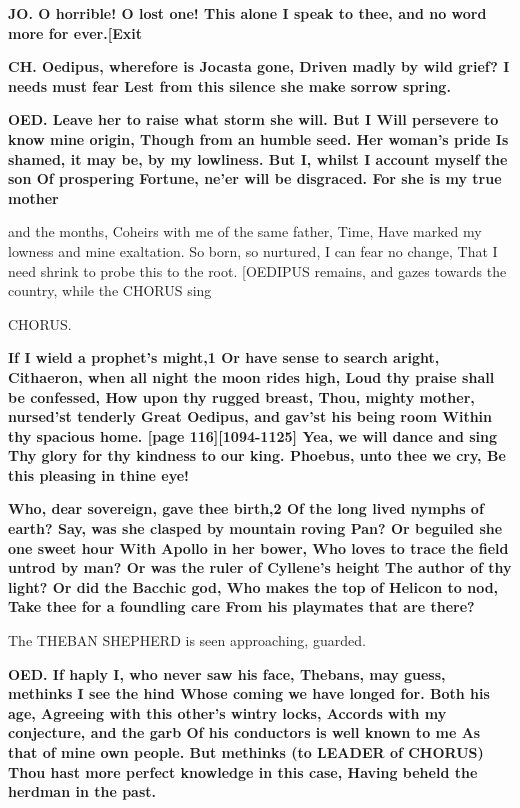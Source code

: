 \documentclass[11pt,letter]{book}
\begin{document}
\par \textbf{JO. O horrible! O lost one! This alone I speak to thee, and no word more for ever.[Exit}
\par 

\par \textbf{CH. Oedipus, wherefore is Jocasta gone, Driven madly by wild grief? I needs must fear Lest from this silence she make sorrow spring.}
\par 

\par \textbf{OED. Leave her to raise what storm she will. But I Will persevere to know mine origin, Though from an humble seed. Her woman’s pride Is shamed, it may be, by my lowliness. But I, whilst I account myself the son Of prospering Fortune, ne’er will be disgraced. For she is my true mother}
\par   and the months, Coheirs with me of the same father, Time, Have marked my lowness and mine exaltation. So born, so nurtured, I can fear no change, That I need shrink to probe this to the root. [OEDIPUS remains, and gazes towards the country, while the CHORUS sing

\par  CHORUS.

\par \textbf{If I wield a prophet’s might,1 Or have sense to search aright, Cithaeron, when all night the moon rides high, Loud thy praise shall be confessed, How upon thy rugged breast, Thou, mighty mother, nursed’st tenderly Great Oedipus, and gav’st his being room Within thy spacious home. [page 116][1094-1125] Yea, we will dance and sing Thy glory for thy kindness to our king. Phoebus, unto thee we cry, Be this pleasing in thine eye!}
\par 

\par \textbf{Who, dear sovereign, gave thee birth,2 Of the long lived nymphs of earth? Say, was she clasped by mountain roving Pan? Or beguiled she one sweet hour With Apollo in her bower, Who loves to trace the field untrod by man? Or was the ruler of Cyllene’s height The author of thy light? Or did the Bacchic god, Who makes the top of Helicon to nod, Take thee for a foundling care From his playmates that are there?}
\par 

\par  The THEBAN SHEPHERD is seen approaching, guarded.

\par \textbf{OED. If haply I, who never saw his face, Thebans, may guess, methinks I see the hind Whose coming we have longed for. Both his age, Agreeing with this other’s wintry locks, Accords with my conjecture, and the garb Of his conductors is well known to me As that of mine own people. But methinks (to LEADER of CHORUS) Thou hast more perfect knowledge in this case, Having beheld the herdman in the past.}
\par 
\end{document}
